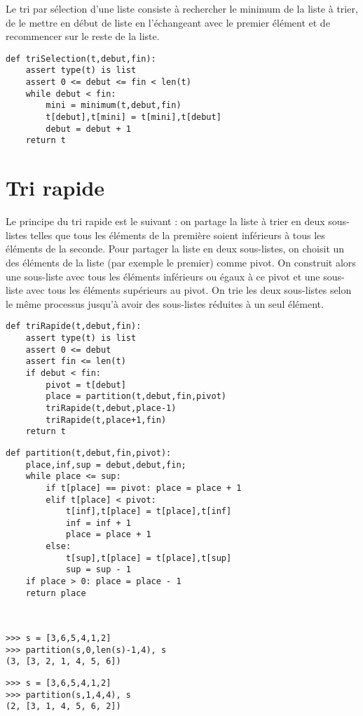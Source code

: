 Le tri par sélection d'une liste consiste à rechercher le minimum de la liste
à trier, de le mettre en début de liste en l'échangeant avec le premier élément
et de recommencer sur le reste de la liste.

\begin{lstlisting}[caption={\bf Tri par sélection},label=cl:triSelection]
def triSelection(t,debut,fin):
    assert type(t) is list
    assert 0 <= debut <= fin < len(t)
    while debut < fin:
        mini = minimum(t,debut,fin)
        t[debut],t[mini] = t[mini],t[debut]
        debut = debut + 1
    return t
\end{lstlisting}

\section*{Tri rapide}
Le principe du tri rapide  est le suivant : on partage la 
liste à trier en deux sous-listes telles que tous les éléments de la première 
soient inférieurs à tous les éléments de la seconde.
Pour partager la liste en deux sous-listes, on choisit un des éléments de la liste
(par exemple le premier) comme pivot. On construit alors une sous-liste
avec tous les éléments inférieurs ou égaux à ce pivot et une sous-liste avec 
tous les éléments supérieurs au pivot.
On trie les deux sous-listes selon le même processus jusqu'à avoir des sous-listes 
réduites à un seul élément.

{}
\begin{lstlisting}[caption={\bf Tri rapide},label=cl:triRapide]
def triRapide(t,debut,fin):
    assert type(t) is list
    assert 0 <= debut 
    assert fin <= len(t)
    if debut < fin:
        pivot = t[debut]
        place = partition(t,debut,fin,pivot)
        triRapide(t,debut,place-1)
        triRapide(t,place+1,fin)
    return t
\end{lstlisting}

\begin{lstlisting}[title={\bf Partition}]
def partition(t,debut,fin,pivot):
    place,inf,sup = debut,debut,fin;
    while place <= sup:
        if t[place] == pivot: place = place + 1
        elif t[place] < pivot:
            t[inf],t[place] = t[place],t[inf]
            inf = inf + 1
            place = place + 1
        else:
            t[sup],t[place] = t[place],t[sup]
            sup = sup - 1
    if place > 0: place = place - 1
    return place
\end{lstlisting}


\mbox{}\ \ \begin{py}{8cm}
\begin{verbatim}
>>> s = [3,6,5,4,1,2]
>>> partition(s,0,len(s)-1,4), s
(3, [3, 2, 1, 4, 5, 6])
\end{verbatim}
\end{py}
\hfill
\begin{py}{5cm}
\begin{verbatim}
>>> s = [3,6,5,4,1,2]
>>> partition(s,1,4,4), s
(2, [3, 1, 4, 5, 6, 2])
\end{verbatim}
\end{py}
